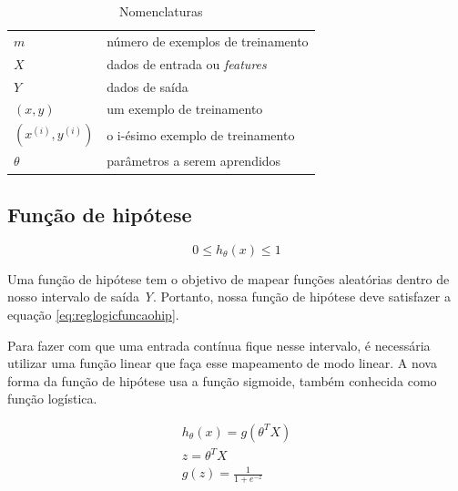 \begin{table}[!htb]
\caption{Nomenclaturas} \label{tab:classificacaonomenclatura}
\begin{center}
\begin{tabular}{m{2.0cm}m{8.0cm}}
  \toprule
  $m$ & número de exemplos de treinamento \\
  $X$ & dados de entrada ou \textit{features} \\
  $Y$ & dados de saída \\
  $(x, y)$ & um exemplo de treinamento \\
  $(x^{(i)}, y^{(i)})$ & o i-ésimo exemplo de treinamento \\
  $\theta$ & parâmetros a serem aprendidos \\
  \bottomrule
\end{tabular}
\end{center}

\end{table}




\subsection{Função de hipótese}

\begin{equation}\label{eq:reglogicfuncaohip}
0 \leq h_{\theta}(x) \leq 1
\end{equation}

Uma função de hipótese tem o objetivo de mapear funções aleatórias dentro de nosso intervalo de saída \textit{Y}. Portanto, nossa função de hipótese deve satisfazer a equação \ref{eq:reglogicfuncaohip}.

Para fazer com que uma entrada contínua fique nesse intervalo, é necessária utilizar uma função linear que faça esse mapeamento de modo linear. A nova forma da função de hipótese usa a função sigmoide, também conhecida como função logística.

\begin{align}
h_{\theta}(x) = g(\theta^TX) \nonumber \\
z = \theta^TX \nonumber \\
g(z) = \frac{1}{1 + e^{-z}} \label{eq:funcaosigmoide}
\end{align}

